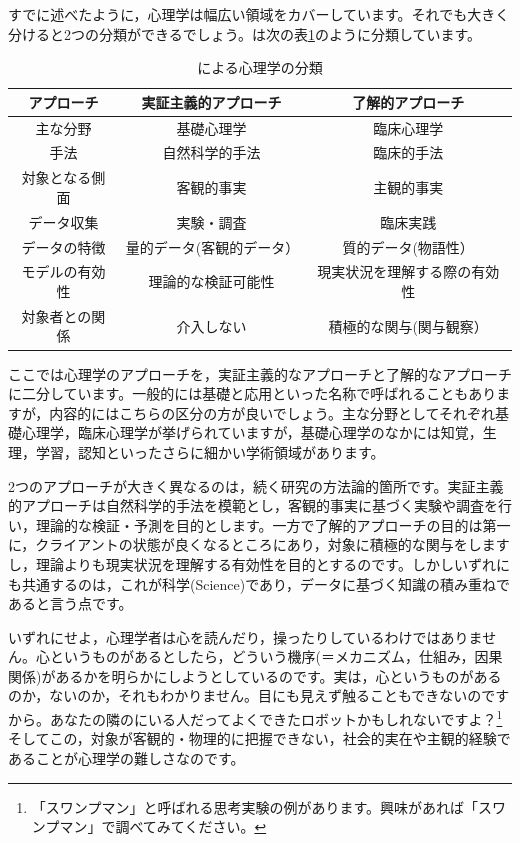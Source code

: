 \documentclass{ltjsbook}
\begin{document}
すでに述べたように，心理学は幅広い領域をカバーしています。それでも大きく分けると2つの分類ができるでしょう。\citet{下山2001}は次の表\ref{tbl01_01}のように分類しています。

\begin{table}[hb]
    \centering
    \caption{\citet{下山2001}による心理学の分類}
    \begin{tabular}{ccc}
    アプローチ   & 実証主義的アプローチ    & 了解的アプローチ       \\\hline\hline
    主な分野    & 基礎心理学         & 臨床心理学          \\
    手法      & 自然科学的手法       & 臨床的手法          \\
    対象となる側面 & 客観的事実         & 主観的事実          \\
    データ収集   & 実験・調査         & 臨床実践           \\
    データの特徴  & 量的データ(客観的データ） & 質的データ(物語性）     \\
    モデルの有効性 & 理論的な検証可能性     & 現実状況を理解する際の有効性 \\
    対象者との関係 & 介入しない         & 積極的な関与(関与観察） \\\hline 
    \end{tabular}
    \label{tbl01_01}
\end{table}
ここでは心理学のアプローチを，実証主義的なアプローチと了解的なアプローチに二分しています。一般的には基礎と応用といった名称で呼ばれることもありますが，内容的にはこちらの区分の方が良いでしょう。主な分野としてそれぞれ基礎心理学，臨床心理学が挙げられていますが，基礎心理学のなかには知覚，生理，学習，認知といったさらに細かい学術領域があります。

2つのアプローチが大きく異なるのは，続く研究の方法論的箇所です。実証主義的アプローチは自然科学的手法を模範とし，客観的事実に基づく実験や調査を行い，理論的な検証・予測を目的とします。一方で了解的アプローチの目的は第一に，クライアントの状態が良くなるところにあり，対象に積極的な関与をしますし，理論よりも現実状況を理解する有効性を目的とするのです。しかしいずれにも共通するのは，これが科学(Science)であり，データに基づく知識の積み重ねであると言う点です。

いずれにせよ，心理学者は心を読んだり，操ったりしているわけではありません。心というものがあるとしたら，どういう機序(＝メカニズム，仕組み，因果関係)があるかを明らかにしようとしているのです。実は，心というものがあるのか，ないのか，それもわかりません。目にも見えず触ることもできないのですから。あなたの隣のにいる人だってよくできたロボットかもしれないですよ？\footnote{「スワンプマン」と呼ばれる思考実験の例があります。興味があれば「スワンプマン」で調べてみてください。}そしてこの，対象が客観的・物理的に把握できない，社会的実在や主観的経験であることが心理学の難しさなのです。
\end{document}
